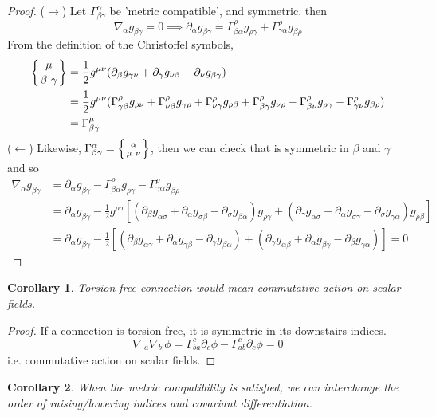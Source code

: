 \documentclass[a4paper]{article}
\theoremstyle{new}
\newtheorem{cor}{Corollary}[section]
\begin{document}
\begin{proof}
($\rightarrow$) Let $\Gamma_{\beta\gamma}^\alpha$ be 'metric compatible', and symmetric. then
$$\nabla_\alpha g_{\beta\gamma}=0\implies\partial_\alpha g_{\beta\gamma}=\Gamma_{\beta\alpha}^\rho g_{\rho\gamma}+\Gamma_{\gamma\alpha}^\rho g_{\beta\rho}$$
From the definition of the Christoffel symbols,
\begin{align}
\left \{ {\mu \atop
\beta\ \gamma}\right \}&=\frac{1}{2}g^{\mu\nu}(\partial_\beta g_{\gamma\nu}+\partial_\gamma g_{\nu\beta}-\partial_\nu g_{\beta\gamma})\nonumber\\&=\frac{1}{2}g^{\mu\nu}(\Gamma^\rho_{\gamma\beta}g_{\rho\nu}+\Gamma_{\nu\beta}^\rho g_{\gamma\rho}+\Gamma_{\nu\gamma}^\rho g_{\rho\beta}+\Gamma_{\beta\gamma}^\rho g_{\nu\rho}-\Gamma_{\beta\nu}^\rho g_{\rho\gamma}-\Gamma_{\gamma\nu}^\rho g_{\beta\rho})\nonumber\\&=\Gamma_{\beta\gamma}^\mu
\end{align}
($\leftarrow$) Likewise, $\Gamma_{\beta\gamma}^\alpha=\left \{ {\alpha \atop
\mu\ \nu}\right \}$, then we can check that is symmetric in $\beta$ and $\gamma$ and so 
\begin{align}
    \nabla_\alpha g_{\beta\gamma}&=\partial_\alpha g_{\beta\gamma}-\Gamma_{\beta\alpha}^\rho g_{\rho\gamma}-\Gamma_{\gamma\alpha}^\rho g_{\beta\rho}\nonumber\\&=\partial_\alpha g_{\beta\gamma}-\frac{1}{2}g^{\rho\sigma}[(\partial_\beta g_{\alpha\sigma}+\partial_\alpha g_{\sigma\beta}-\partial_\sigma g_{\beta\alpha})g_{\rho\gamma}+(\partial_\gamma g_{\alpha\sigma}+\partial_\alpha g_{\sigma\gamma}-\partial_\sigma g_{\gamma\alpha})g_{\rho\beta}]\nonumber\\&=\partial_\alpha g_{\beta\gamma}-\frac{1}{2}[(\partial_\beta g_{\alpha\gamma}+\partial_\alpha g_{\gamma\beta}-\partial_\gamma g_{\beta\alpha})+(\partial_\gamma g_{\alpha\beta}+\partial_\alpha g_{\beta\gamma}-\partial_\beta g_{\gamma\alpha})]=0\nonumber
\end{align}
\end{proof}
\begin{cor}
Torsion free connection would mean commutative action on scalar fields.
\end{cor}
\begin{proof}
If a connection is torsion free, it is symmetric in its downstairs indices.
$$\nabla_{[a}\nabla_{b]}\phi=\Gamma_{ba}^c\partial_c\phi-\Gamma_{ab}^c\partial_c\phi=0$$
i.e. commutative action on scalar fields.
\end{proof}
\begin{cor}
When the metric compatibility is satisfied, we can interchange the order of raising/lowering indices and covariant differentiation.
\end{cor}
\end{document}
